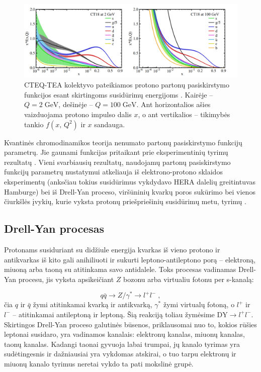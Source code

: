 \documentclass[a4paper, 12pt, oneside]{article}
\newcommand{\DY}{\mathrm{DY}}
\newlength\q
\begin{document}
\begin{figure}[t]
	\includegraphics[width=\linewidth]{CT18_PDF.png}
	\caption{\label{fig:PDFs}
		CTEQ-TEA kolektyvo pateikiamos protono partonų pasiskirstymo funkcijos esant skirtingoms susidūrimų energijoms \cite{CTEQ2019}.
		Kairėje -- $Q=2 \; \mathrm{GeV}$, dešinėje -- $Q=100 \; \mathrm{GeV}$.
		Ant horizontalios ašies vaizduojama protono impulso dalis $x$, o ant vertikalios -- tikimybės tankio $f(x,\, Q^2)$
		ir $x$ sandauga.}
\end{figure}

Kvantinės chromodinamikos teorija nenumato partonų pasiskirstymo funkcijų parametrų.
Jie gaunami funkcijas pritaikant prie eksperimentinių tyrimų rezultatų \cite{NNPDF, PDF_ABMP16, CTEQ2019}.
Vieni svarbiausių rezultatų, naudojamų partonų pasiskirstymo funkcijų parametrų nustatymui atkeliauja iš elektrono-protono
sklaidos eksperimentų (anksčiau tokius susidūrimus vykdydavo HERA dalelių greitintuvas Hamburge) bei iš
Drell-Yan proceso, viršūninių kvarkų poros sukūrimo bei vienos čiurkšlės įvykių, kurie vyksta protonų priešpriešinių susidūrimų
metu, tyrimų \cite{CTEQ2019}.


\subsection{Drell-Yan procesas}
Protonams susiduriant su didžiule energija kvarkas iš vieno protono ir antikvarkas iš kito gali anihiliuoti ir sukurti leptono-antileptono
porą -- elektroną, miuoną arba taoną su atitinkama savo antidalele.
Toks procesas vadinamas Drell-Yan procesu, jis vyksta apsikeičiant $Z$ bozonu arba virtualiu fotonu per s-kanalą:

\begin{equation*}
	q\bar{q} \rightarrow Z/ \gamma^{*} \rightarrow l^{+}l^{-} \; ,
\end{equation*}
čia $q$ ir $\bar{q}$ žymi atitinkamai kvarką ir antikvarką, $\gamma^*$ žymi virtualų fotoną, o $l^+$ ir $l^-$ -- atitinkamai
antileptoną ir leptoną.
Šią reakciją toliau žymėsime $\DY \! \rightarrow \! l^{+}l^{-}$.
Skirtingos Drell-Yan proceso galutinės būsenos, priklausomai nuo to, kokios rūšies leptonai susidaro, yra
vadinamos kanalais: elektronų kanalas, miuonų kanalas, taonų kanalas.
Kadangi taonai gyvuoja labai trumpai, jų kanalo tyrimas yra sudėtingesnis ir dažniausiai yra vykdomas atskirai,
o tuo tarpu elektronų ir miuonų kanalo tyrimus neretai vykdo ta pati mokslinė grupė.
\end{document}
